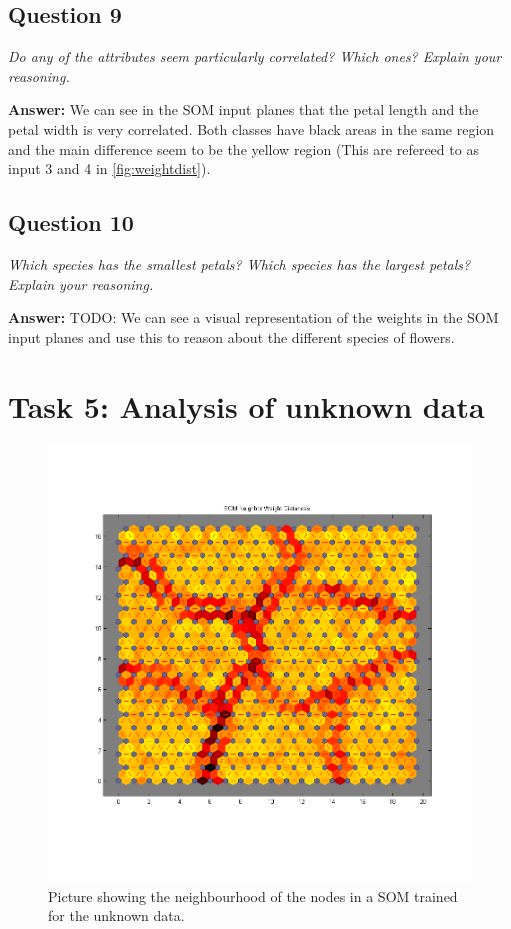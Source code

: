 \documentclass[a4paper]{article}
\begin{document}
\subsection*{Question 9}
\emph{Do any of the attributes seem particularly correlated? Which
ones? Explain your reasoning.}

\textbf{Answer:}  We can see in the SOM input planes that the petal length and the petal width is very correlated. Both classes have black areas in the same region and the main difference seem to be the yellow region (This are refereed to as input 3 and 4 in \ref{fig:weightdist}). 

\subsection*{Question 10}
\emph{Which species has the smallest petals? Which species has the
largest petals? Explain your reasoning.}

\textbf{Answer:} TODO: We can see a visual representation of the weights in the SOM input planes and use this to reason about the different species of flowers.

\section*{Task 5: Analysis of unknown data}

 \begin{figure}[H] %
	 \includegraphics[scale=0.6]{20x20trainedUnknown.png}
	 \caption{\label{fig:20x20trainedUnknown} Picture showing the neighbourhood of the nodes in a SOM trained for the unknown data.}
 \end{figure}
\end{document}
